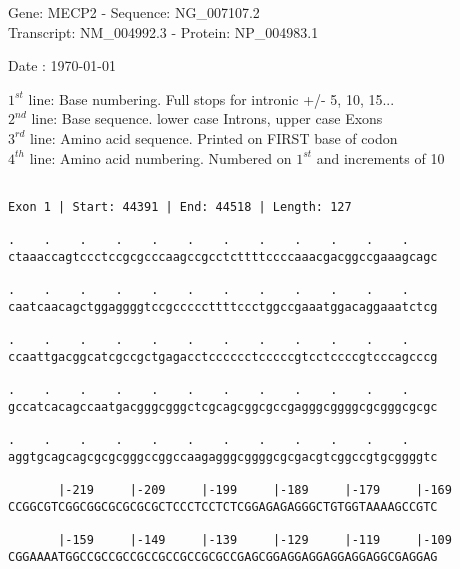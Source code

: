\documentclass{article}
\begin{document}
\begin{center}
\begin{large}
Gene: MECP2 - Sequence: NG\_007107.2\\
Transcript: NM\_004992.3 - Protein: NP\_004983.1
 
 Date : \today
\end{large}
\end{center}
$1^{st}$ line: Base numbering. Full stops for intronic +/- 5, 10, 15...\\
$2^{nd}$ line: Base sequence. lower case Introns, upper case Exons\\
$3^{rd}$ line: Amino acid sequence. Printed on FIRST base of codon\\
$4^{th}$ line: Amino acid numbering. Numbered on $1^{st}$ and increments of 10\\
 \begin{Verbatim}
 
Exon 1 | Start: 44391 | End: 44518 | Length: 127
 
.    .    .    .    .    .    .    .    .    .    .    .    
ctaaaccagtccctccgcgcccaagccgcctcttttccccaaacgacggccgaaagcagc
                                                            
.    .    .    .    .    .    .    .    .    .    .    .    
caatcaacagctggaggggtccgcccccttttccctggccgaaatggacaggaaatctcg
                                                            
.    .    .    .    .    .    .    .    .    .    .    .    
ccaattgacggcatcgccgctgagacctcccccctcccccgtcctccccgtcccagcccg
                                                            
.    .    .    .    .    .    .    .    .    .    .    .    
gccatcacagccaatgacgggcgggctcgcagcggcgccgagggcggggcgcgggcgcgc
                                                            
.    .    .    .    .    .    .    .    .    .    .    .    
aggtgcagcagcgcgcgggccggccaagagggcggggcgcgacgtcggccgtgcggggtc
                                                            
       |-219     |-209     |-199     |-189     |-179     |-169
CCGGCGTCGGCGGCGCGCGCGCTCCCTCCTCTCGGAGAGAGGGCTGTGGTAAAAGCCGTC
                                                            
       |-159     |-149     |-139     |-129     |-119     |-109
CGGAAAATGGCCGCCGCCGCCGCCGCCGCGCCGAGCGGAGGAGGAGGAGGAGGCGAGGAG
                                                            

\end{Verbatim}
\end{document}
